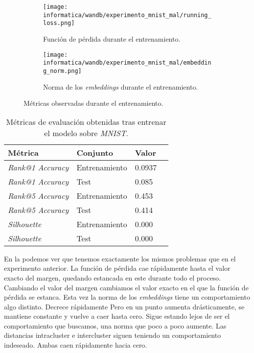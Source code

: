 \begin{figure}
\ajustarsubcaptions
\centering
    \begin{subfigure}{.5\textwidth}
        \centering
        \texttt{[image: informatica/wandb/experimento\_mnist\_mal/running\_loss.png]}
        \caption{Función de pérdida durante el entrenamiento.}
    \end{subfigure}%
    \begin{subfigure}{.5\textwidth}
        \centering
        \texttt{[image: informatica/wandb/experimento\_mnist\_mal/embedding\_norm.png]}
        \caption{Norma de los \textit{embeddings} durante el entrenamiento.}
    \end{subfigure}
    \label{img:progreso_entrenamiento_mnist_mal}
\caption{Métricas observadas durante el entrenamiento.}
\end{figure}


\begin{table}[H]
\centering
\begin{tabular}{|l|l|l|l|}
    \hline
    Métrica & Conjunto & Valor \\
    \hline

    \textit{Rank@1 Accuracy} & Entrenamiento & 0.0937 \\
    \textit{Rank@1 Accuracy} & Test & 0.085  \\
    \textit{Rank@5 Accuracy} & Entrenamiento & 0.453  \\
    \textit{Rank@5 Accuracy} & Test & 0.414 \\
    \textit{Silhouette} & Entrenamiento & 0.000 \\
    \textit{Silhouette} & Test & 0.000 \\

    \hline

\end{tabular}
\caption{Métricas de evaluación obtenidas tras entrenar el modelo sobre \textit{MNIST}.}
    \label{table:resultados_mnist_mal}
\end{table}

En la  podemos ver que tenemos exactamente los mismos problemas que en el experimento anterior. La función de pérdida cae rápidamente hasta el valor exacto del margen, quedando estancada en este durante todo el proceso. Cambiando el valor del margen cambiamos el valor exacto en el que la función de pérdida se estanca. Esta vez la norma de los \textit{embeddings} tiene un comportamiento algo distinto. Decrece rápidamente Pero en un punto aumenta drásticamente, se mantiene constante y vuelve a caer hasta cero. Sigue estando lejos de ser el comportamiento que buscamos, una norma que poco a poco aumente. Las distancias intracluster e intercluster siguen teniendo un comportamiento indeseado. Ambas caen rápidamente hacia cero.

